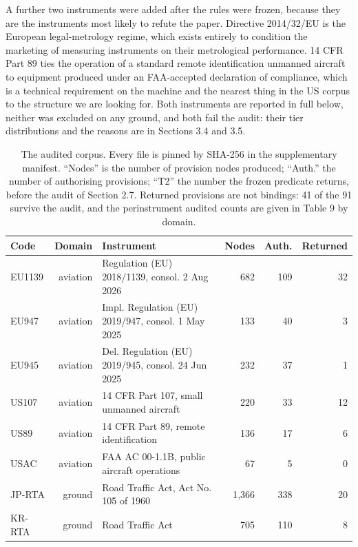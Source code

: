 A further two instruments were added after the rules were frozen, because they are the instruments most likely to refute the paper. Directive 2014/32/EU is the European legal-metrology regime, which exists entirely to condition the marketing of measuring instruments on their metrological performance. 14 CFR Part 89 ties the operation of a standard remote identification unmanned aircraft to equipment produced under an FAA-accepted declaration of compliance, which is a technical requirement on the machine and the nearest thing in the US corpus to the structure we are looking for. Both instruments are reported in full below, neither was excluded on any ground, and both fail the audit: their tier distributions and the reasons are in Sections 3.4 and 3.5.

\begin{table}[!htb]
\centering
\caption{The audited corpus. Every file is pinned by SHA-256 in the supplementary manifest. ``Nodes'' is the number of provision nodes produced; ``Auth.'' the number of authorising provisions; ``T2'' the number the frozen predicate returns, before the audit of Section 2.7. Returned provisions are not bindings: 41 of the 91 survive the audit, and the perinstrument audited counts are given in Table 9 by domain.}
\label{tab:t1}
\footnotesize
\begin{tabularx}{\textwidth}{@{}lrXrrr@{}}
\toprule
Code & Domain & Instrument & Nodes & Auth. & Returned \\
\midrule
EU1139 & aviation & Regulation (EU) 2018/1139, consol. 2 Aug 2026 \citep{EUReg2018_1139} & 682 & 109 & 32 \\
EU947 & aviation & Impl. Regulation (EU) 2019/947, consol. 1 May 2025 \citep{EUReg2019_947} & 133 & 40 & 3 \\
EU945 & aviation & Del. Regulation (EU) 2019/945, consol. 24 Jun 2025 \citep{EUReg2019_945} & 232 & 37 & 1 \\
US107 & aviation & 14 CFR Part 107, small unmanned aircraft \citep{USCFR107} & 220 & 33 & 12 \\
US89 & aviation & 14 CFR Part 89, remote identification \citep{USCFR89} & 136 & 17 & 6 \\
USAC & aviation & FAA AC 00-1.1B, public aircraft operations \citep{FAAAC0011B} & 67 & 5 & 0 \\
JP-RTA & ground & Road Traffic Act, Act No. 105 of 1960 \citep{JPRoadTrafficAct} & 1,366 & 338 & 20 \\
KR-RTA & ground & Road Traffic Act \citep{ROKRoadTrafficAct} & 705 & 110 & 8 \\

\end{tabularx}
\end{table}
